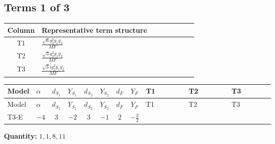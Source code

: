 \documentclass[8pt]{article}
\begin{document}
\begin{landscape}
\subsection*{Terms 1 of 3}
\begin{center}
\begin{tabular}{@{}c >{\raggedright\arraybackslash}p{0.82\linewidth}@{}}
\toprule
Column & Representative term structure \\
\midrule
T1 & \(\displaystyle \frac{\sqrt{6} g_{2}^{2} \overline{y_{1}} \overline{y_{2}}}{MF}\) \\
\midrule
T2 & \(\displaystyle \frac{\sqrt{3} g_{2}^{2} \overline{y_{1}} \overline{y_{2}}}{MF}\) \\
\midrule
T3 & \(\displaystyle \frac{\sqrt{3} i g_{2}^{2} \overline{y_{1}} \overline{y_{2}}}{MF}\) \\
\midrule
\bottomrule
\end{tabular}
\end{center}
\smallskip
\tiny
\begin{longtable}{@{}llcccccc >{\raggedright\arraybackslash}p{0.21\linewidth} >{\raggedright\arraybackslash}p{0.21\linewidth} >{\raggedright\arraybackslash}p{0.21\linewidth}@{}}
\toprule
Model & $\alpha$ & $d_{S_1}$ & $Y_{S_1}$ & $d_{S_2}$ & $Y_{S_2}$ & $d_F$ & $Y_F$ & T1 & T2 & T3 \\
\midrule
\endfirsthead
\toprule
Model & $\alpha$ & $d_{S_1}$ & $Y_{S_1}$ & $d_{S_2}$ & $Y_{S_2}$ & $d_F$ & $Y_F$ & T1 & T2 & T3 \\
\midrule
\endhead
T3-E & $-4$ & $3$ & $-2$ & $3$ & $-1$ & $2$ & $-\frac{3}{2}$ & \scriptsize\adjustbox{max width=\linewidth}{$\begin{gathered} \frac{\sqrt{6} g_{2}^{2} \overline{y_{1}} \overline{y_{2}}}{3 MF}\end{gathered}$} & \scriptsize\adjustbox{max width=\linewidth}{$\begin{gathered} \frac{\sqrt{3} g_{2}^{2} \overline{y_{1}} \overline{y_{2}}}{6 MF}\end{gathered}$} & \scriptsize\adjustbox{max width=\linewidth}{$\begin{gathered} - \frac{49 \sqrt{3} i g_{2}^{2} \overline{y_{1}} \overline{y_{2}}}{24 MF}\end{gathered}$} \\
\midrule
\bottomrule
\end{longtable}
\clearpage
\noindent\textbf{Quantity: }$\mathrm{1,1,8,11}$\par\smallskip

\end{landscape}
\end{document}
